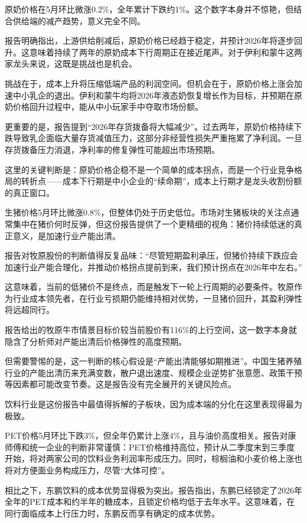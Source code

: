\documentclass[11pt]{ctexart}
\begin{document}
原奶价格在5月环比微涨0.2\%，全年累计下跌约1\%。这个数字本身并不惊艳，但结合供给端的减产趋势，意义完全不同。

报告明确指出，上游供给削减后，原奶价格已经趋于稳定，并预计2026年将逐步回升。这意味着持续了两年的原奶成本下行周期正在接近尾声。对于伊利和蒙牛这两家龙头来说，这既是挑战也是机会。

挑战在于，成本上升将压缩低端产品的利润空间。但机会在于，原奶价格上涨会加速中小乳企的退出。伊利和蒙牛均将2026年液态奶恢复增长作为目标，并预期在原奶价格回升过程中，能从中小玩家手中夺取市场份额。

更重要的是，报告提到“2026年存货拨备将大幅减少”。过去两年，原奶价格持续下跌导致乳企面临大量存货减值压力，这部分非经营性损失严重拖累了净利润。一旦存货拨备压力消退，净利率的修复弹性可能超出市场预期。

这里的关键判断是：原奶价格企稳不是一个简单的成本拐点，而是一个行业竞争格局的转折点——成本下行期是中小企业的“续命期”，成本上行期才是龙头收割份额的真正窗口。

生猪价格5月环比微涨0.8\%，但整体仍处于历史低位。市场对生猪板块的关注点通常集中在猪价何时反弹，但这份报告提供了一个更精细的视角：猪价持续低迷的真正意义，是加速行业产能出清。

报告对牧原股份的判断值得反复品味：“尽管短期盈利承压，但猪价持续下跌应会加速行业产能合理化，并推动价格拐点提前到来，我们预计拐点在2026年中左右。”

这意味着，当前的低猪价不是终点，而是触发下一轮上行周期的必要条件。牧原作为行业成本领先者，在行业亏损期仍能维持相对优势，一旦猪价回升，其盈利弹性将远超同行。

报告给出的牧原牛市情景目标价较当前股价有116\%的上行空间，这一数字本身就隐含了分析师对产能出清后价格弹性的高度预期。

但需要警惕的是，这一判断的核心假设是“产能出清能够如期推进”。中国生猪养殖行业的产能出清历来充满变数，散户退出速度、规模企业逆势扩张意愿、政策干预等因素都可能改变节奏。这是报告没有完全展开的关键风险点。

饮料行业是这份报告中最值得拆解的子板块，因为成本端的分化在这里表现得最为极致。

PET价格5月环比下跌3\%，但全年仍累计上涨4\%，且与油价高度相关。报告对康师傅和统一企业的判断非常谨慎：PET价格维持高位，预计从二季度末到三季度开始，将对两家公司的饮料业务利润率形成压力。同时，棕榈油和小麦价格上涨也将对方便面业务构成压力，尽管“大体可控”。

相比之下，东鹏饮料的成本优势显得极为突出。报告指出，东鹏已经锁定了2026年全年的PET成本和约半年的糖成本，且锁定价格均低于去年水平。这意味着，在同行面临成本上行压力时，东鹏反而享有确定的成本优势。
\end{document}

